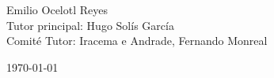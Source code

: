 \documentclass[12pt]{article}
\begin{document}
\begin{titlepage}
\begin{center}
    {\large Emilio Ocelotl Reyes\\
      Tutor principal: Hugo Solís García\\
      Comité Tutor: Iracema e Andrade, Fernando Monreal\par}                                                                                                                                            
\vfill                                                                                                                                                                        
    {\large \today \par}                                                                                                                                                      
    \end{center}                                                                                                                                                              
\end{titlepage}                                                                                                                                                               
\end{document}

